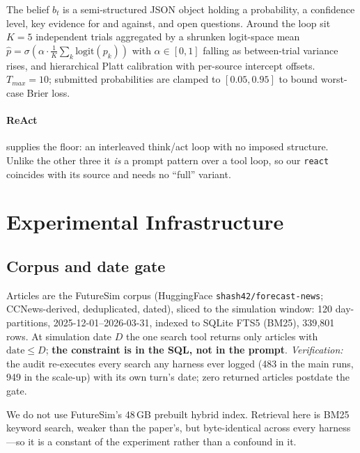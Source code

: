 \documentclass[10pt]{article}
\newcommand{\hr}[1]{\texttt{#1}}
\begin{document}
The belief $b_t$ is a semi-structured JSON object holding a probability, a confidence level, key
evidence for and against, and open questions. Around the loop sit $K{=}5$ independent trials
aggregated by a shrunken logit-space mean
$\hat p=\sigma\!\left(\alpha\cdot\frac1K\sum_k\mathrm{logit}(p_k)\right)$ with $\alpha\in[0,1]$
falling as between-trial variance rises, and hierarchical Platt calibration with per-source
intercept offsets. $T_{max}{=}10$; submitted probabilities are clamped to $[0.05,0.95]$ to bound
worst-case Brier loss.

\paragraph{ReAct~\cite{react}} supplies the floor: an interleaved think/act loop with no imposed
structure. Unlike the other three it \emph{is} a prompt pattern over a tool loop, so our
\hr{react} coincides with its source and needs no ``full'' variant.

\section{Experimental Infrastructure}\label{sec:infra}
\subsection{Corpus and date gate}
Articles are the FutureSim corpus (HuggingFace \texttt{shash42/forecast-news}; CCNews-derived,
deduplicated, dated), sliced to the simulation window: 120 day-partitions,
2025-12-01--2026-03-31, indexed to SQLite FTS5 (BM25), 339{,}801 rows. At simulation date $D$ the
one search tool returns only articles with $\text{date}\le D$; \textbf{the constraint is in the
SQL, not in the prompt}. \emph{Verification:} the audit re-executes every search any harness ever
logged (483 in the main runs, 949 in the scale-up) with its own turn's date; zero returned
articles postdate the gate.

We do not use FutureSim's 48\,GB prebuilt hybrid index. Retrieval here is BM25 keyword search,
weaker than the paper's, but byte-identical across every harness---so it is a constant of the
experiment rather than a confound in it.
\end{document}

